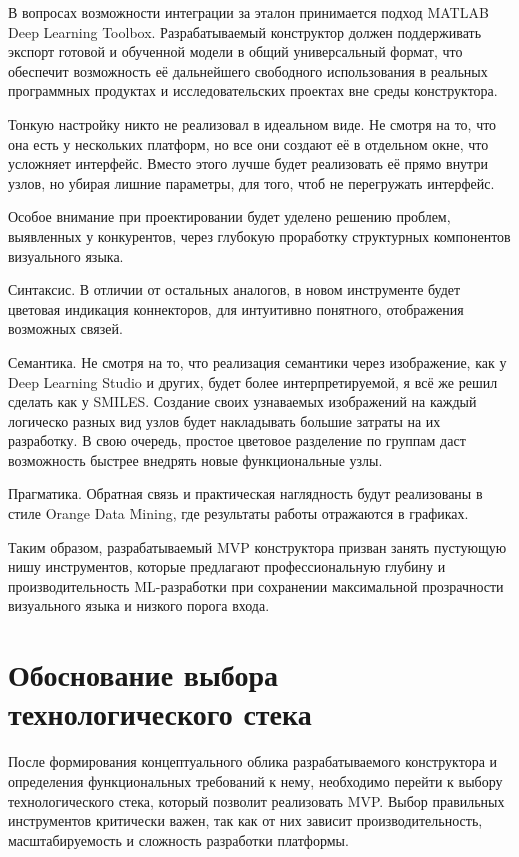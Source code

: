 \documentclass{report}
\begin{document}
В вопросах возможности интеграции за эталон принимается подход MATLAB Deep Learning Toolbox. Разрабатываемый конструктор должен поддерживать экспорт готовой и обученной модели в общий универсальный формат, что обеспечит возможность её дальнейшего свободного использования в реальных программных продуктах и исследовательских проектах вне среды конструктора.

Тонкую настройку никто не реализовал в идеальном виде. Не смотря на то, что она есть у нескольких платформ, но все они создают её в отдельном окне, что усложняет интерфейс. Вместо этого лучше будет реализовать её прямо внутри узлов, но убирая лишние параметры, для того, чтоб не перегружать интерфейс.

Особое внимание при проектировании будет уделено решению проблем, выявленных у конкурентов, через глубокую проработку структурных компонентов визуального языка.

\begin{enummarker}
\item Синтаксис. В отличии от остальных аналогов, в новом инструменте будет цветовая индикация коннекторов, для интуитивно понятного, отображения возможных связей.
\item Семантика. Не смотря на то, что реализация семантики через изображение, как у Deep Learning Studio и других, будет более интерпретируемой, я всё же решил сделать как у SMILES. Создание своих узнаваемых изображений на каждый логическо разных вид узлов будет накладывать большие затраты на их разработку. В свою очередь, простое цветовое разделение по группам даст возможность быстрее внедрять новые функциональные узлы.
\item Прагматика. Обратная связь и практическая наглядность будут реализованы в стиле Orange Data Mining, где результаты работы отражаются в графиках.
\end{enummarker}

Таким образом, разрабатываемый MVP конструктора призван занять пустующую нишу инструментов, которые предлагают профессиональную глубину и производительность ML-разработки при сохранении максимальной прозрачности визуального языка и низкого порога входа.


\section{Обоснование выбора технологического стека}

После формирования концептуального облика разрабатываемого конструктора и определения функциональных требований к нему, необходимо перейти к выбору технологического стека, который позволит реализовать MVP. Выбор правильных инструментов критически важен, так как от них зависит производительность, масштабируемость и сложность разработки платформы.
\end{document}
